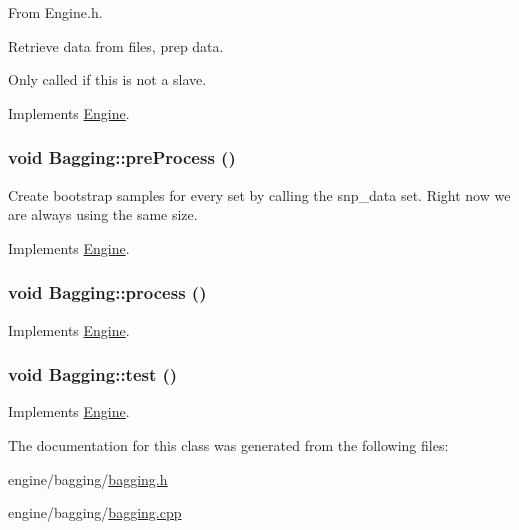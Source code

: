 From Engine.h. 

Retrieve data from files, prep data.

Only called if this is not a slave. 

Implements \hyperlink{classEngine_aaa054d596fb8ced6e3eb4bee208f8c3d}{Engine}.

\hypertarget{classBagging_a638e97695ee9a685cfee7ce459c2b8f8}{
\subsubsection[{preProcess}]{\setlength{\rightskip}{0pt plus 5cm}void Bagging::preProcess ()}}
\label{classBagging_a638e97695ee9a685cfee7ce459c2b8f8}
Create bootstrap samples for every set by calling the snp\_\-data set. Right now we are always using the same size. 

Implements \hyperlink{classEngine_aec7076b8979a13c96eceb362437dc68c}{Engine}.

\hypertarget{classBagging_ab732c0768147c13071d4fc23d879dfd4}{
\subsubsection[{process}]{\setlength{\rightskip}{0pt plus 5cm}void Bagging::process ()}}
\label{classBagging_ab732c0768147c13071d4fc23d879dfd4}


Implements \hyperlink{classEngine_a005f8e277c3dea16ea05803fba223db7}{Engine}.

\hypertarget{classBagging_afd3022e8be01cba7f97fc9f81cda8016}{
\subsubsection[{test}]{\setlength{\rightskip}{0pt plus 5cm}void Bagging::test ()}}
\label{classBagging_afd3022e8be01cba7f97fc9f81cda8016}


Implements \hyperlink{classEngine_a2927c4a4263809453063ad482c6434a4}{Engine}.



The documentation for this class was generated from the following files:\begin{DoxyCompactItemize}
\item 
engine/bagging/\hyperlink{bagging_8h}{bagging.h}\item 
engine/bagging/\hyperlink{bagging_8cpp}{bagging.cpp}\end{DoxyCompactItemize}
